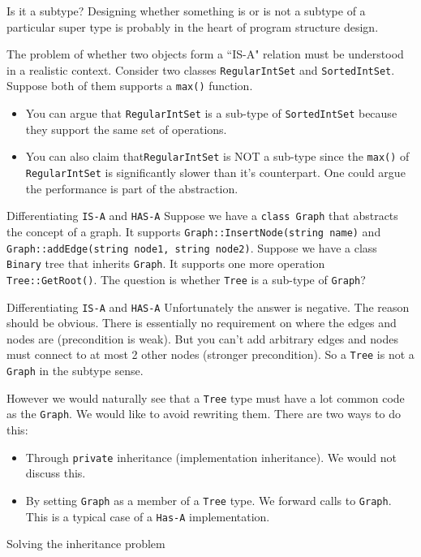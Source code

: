 \begin{frame}{Is it a subtype?}
Designing whether something is or is not a subtype of a particular super type is probably in the heart of program structure design.


The problem of whether two objects form a ``IS-A" relation must be understood in a realistic context. Consider two classes \texttt{RegularIntSet} and \texttt{SortedIntSet}. Suppose both of them supports a \texttt{max()} function.
\begin{itemize}
	\item You can argue that \texttt{RegularIntSet} is a sub-type of \texttt{SortedIntSet} because they support the same set of operations.
	\item You can also claim that\texttt{RegularIntSet} is NOT a sub-type since the \texttt{max()} of \texttt{RegularIntSet} is significantly slower than it's counterpart. One could argue the performance is part of the abstraction.
\end{itemize}
\end{frame}


\begin{frame}{Differentiating \texttt{IS-A} and \texttt{HAS-A}}
Suppose we have a \texttt{class Graph} that abstracts the concept of a graph. It supports \texttt{Graph::InsertNode(string name)} and \texttt{Graph::addEdge(string node1, string node2)}. Suppose we have a class \texttt{Binary} tree that inherits \texttt{Graph}. It supports one more operation \texttt{Tree::GetRoot()}. The question is whether \texttt{Tree} is a sub-type of \texttt{Graph}?
\end{frame}

\begin{frame}{Differentiating \texttt{IS-A} and \texttt{HAS-A}}
Unfortunately the answer is negative. The reason should be obvious. There is essentially no requirement on where the edges and nodes are (precondition is weak). But you can't add arbitrary edges and nodes must connect to at most 2 other nodes (stronger precondition). \alert{So a \texttt{Tree} is not a  \texttt{Graph} in the subtype sense}.

\vspace{0.1in}
However we would naturally see that a \texttt{Tree} type must have a lot common code as the \texttt{Graph}. We would like to avoid rewriting them. There are two ways to do this:
\begin{itemize}
	\item Through \texttt{private} inheritance (implementation inheritance). We would not discuss this.
	\item By setting \texttt{Graph} as a member of a \texttt{Tree} type. We forward calls to \texttt{Graph}. This is a typical case of a \texttt{Has-A} implementation.
\end{itemize} 
\end{frame}


\begin{frame}{Solving the inheritance problem}

\end{frame}
